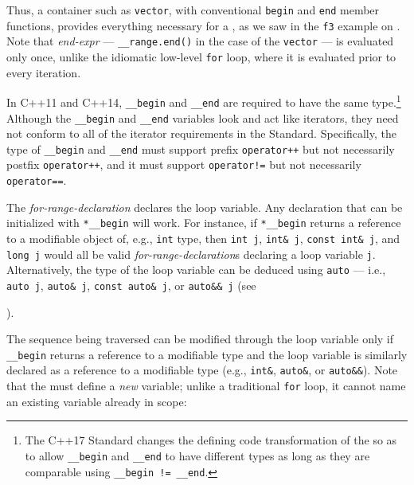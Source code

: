 {Thus, a container such as \lstinline!vector!, with conventional
\lstinline!begin! and \lstinline!end! member functions, provides everything
necessary for a , as we saw in the
\lstinline!f3! example on \pageref{iterating-over-std::vector-with-a-range-based-for-loop}. Note that \emph{end-expr} ---
\lstinline!__range.end()! in the case of the \lstinline!vector! --- is
evaluated only once, unlike the idiomatic low-level \lstinline!for! loop,
where it is evaluated prior to every iteration.

In C++11 and C++14, \lstinline!__begin! and \lstinline!__end! are required
to have the same type.{\cprotect\footnote{The C++17 Standard changes the
defining code transformation of the  so as to allow \lstinline!__begin! and \lstinline!__end! to have
different types as long as they are comparable using
  \lstinline!__begin!~\lstinline|!=|~\lstinline!__end!.}} Although the
\lstinline!__begin! and \lstinline!__end! variables look and act like
iterators, they need not conform to all of the iterator requirements in
the Standard. Specifically, the type of \lstinline!__begin! and
\lstinline!__end! must support prefix \lstinline!operator++! but not
necessarily postfix \lstinline!operator++!, and it must support
\lstinline|operator!=| but not necessarily \lstinline|operator==|.

The \emph{for-range-declaration} declares the loop variable. Any
declaration that can be initialized with \lstinline!*__begin! will work.
For instance, if \lstinline!*__begin! returns a reference to a modifiable
object of, e.g., \lstinline!int! type, then \lstinline!int!~\lstinline!j!,
\lstinline!int&!~\lstinline!j!, \lstinline!const!~\lstinline!int&!~\lstinline!j!, and
\lstinline!long!~\lstinline!j! would all be valid
\emph{for-range-declaration}s declaring a loop variable \lstinline!j!.
Alternatively, the type of the loop variable can be deduced using
\lstinline!auto! --- i.e., \lstinline!auto!~\lstinline!j!,
\lstinline!auto&!~\lstinline!j!, \lstinline!const!~\lstinline!auto&!~\lstinline!j!,
or \lstinline!auto&&!~\lstinline!j! (see {).

The sequence being traversed can be modified through the loop variable
only if \lstinline!__begin! returns a reference to a modifiable type and
the loop variable is similarly declared as a reference to a modifiable
type (e.g., \lstinline!int&!, \lstinline!auto&!, or \lstinline!auto&&!). Note
that the  must define a \emph{new}
variable; unlike a traditional \lstinline!for! loop, it cannot name an
existing variable already in scope:

}}

